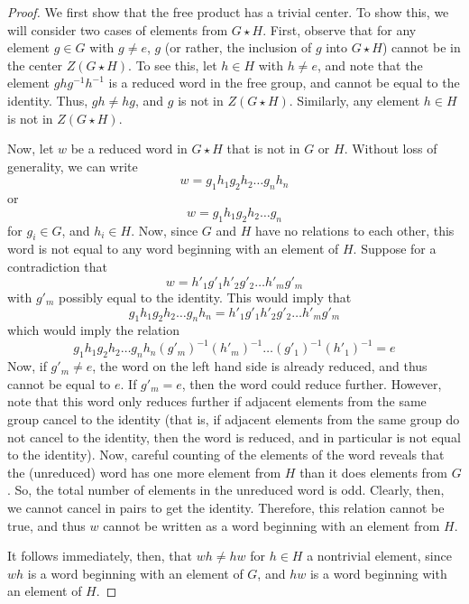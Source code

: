 \documentclass[fontsize=11pt]{scrartcl} %
\numberwithin{equation}{section} %
\numberwithin{figure}{section} %
\numberwithin{table}{section} %
\begin{document}
\begin{proof}
    We first show that the free product has a trivial center. To show this, we
    will consider two cases of elements from $G\star H$. First, observe
    that for any element $g\in G$ with $g\neq e$, $g$ (or rather, the inclusion
    of $g$ into $G\star H$) cannot be in the center $Z(G\star H)$. To see this,
    let $h\in H$ with $h\neq e$, and note that the element $ghg^{-1}h^{-1}$ is a
    reduced word in the free group, and cannot be equal to the identity. Thus,
    $gh\neq hg$, and $g$ is not in $Z(G\star H)$.  Similarly, any element $h\in
    H$ is not in $Z(G\star H)$.

    Now, let $w$ be a reduced word in $G\star H$ that is not in $G$ or $H$.
    Without loss of generality, we can write
    \[
        w = g_1h_1g_2h_2\dots g_nh_n
    \]
    or
    \[
        w = g_1h_1g_2h_2\dots g_n
    \]
    for $g_i\in G$, and $h_i\in H$. Now, since $G$ and $H$ have no relations to
    each other, this word is not equal to any word beginning with an element of
    $H$. Suppose for a contradiction that
    \[
        w = h'_1g'_1h'_2g'_2\dots h'_mg'_m
    \]
    with $g'_m$ possibly equal to the identity.
    This would imply that
    \[
        g_1h_1g_2h_2\dots g_nh_n = h'_1g'_1h'_2g'_2\dots h'_mg'_m
    \]
    which would imply the relation
    \[
        g_1h_1g_2h_2\dots g_nh_n(g'_m)^{-1}(h'_m)^{-1}\dots
        (g'_1)^{-1}(h'_1)^{-1} = e
    \]
    Now, if $g'_m\neq e$, the word on the left hand side is already reduced, and
    thus cannot be equal to $e$. If $g'_m=e$, then the word could reduce
    further. However, note that this word only reduces further if adjacent
    elements from the same group cancel to the identity (that is, if adjacent
        elements from the same group do not cancel to the identity, then
    the word is reduced, and in particular is not equal to the identity). Now,
    careful counting of the elements of the word reveals that the (unreduced)
    word has one more element from $H$ than it does elements from $G$. So, the
    total number of elements in the unreduced word is odd. Clearly, then, we
    cannot cancel in pairs to get the identity. 
    Therefore, this relation cannot be true, and thus $w$ cannot be written as a
    word beginning with an element from $H$.

    It follows immediately, then, that $wh\neq hw$ for $h\in H$ a nontrivial
    element, since $wh$ is a word beginning with an element of $G$, and $hw$ is
    a word beginning with an element of $H$.


\end{proof}
\end{document}
